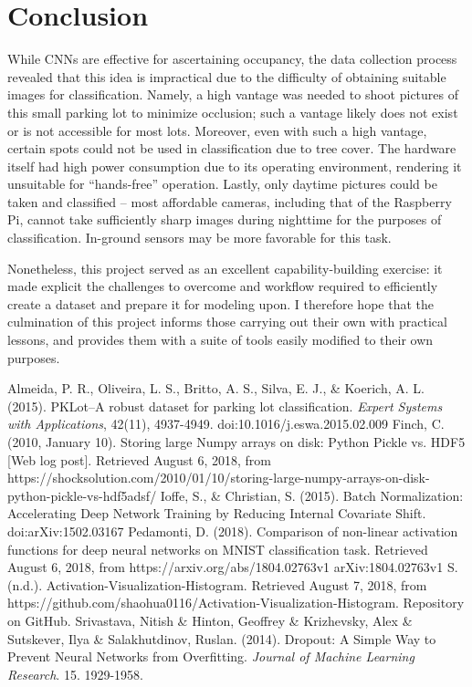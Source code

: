 \documentclass[a4paper, 11pt]{article} %
\begin{document}
\section{Conclusion}
	While CNNs are effective for ascertaining occupancy, the data collection 
	process 
	revealed that this idea is impractical due to the difficulty of 
	obtaining suitable images for classification. Namely, a high vantage was 
	needed to shoot pictures of this small parking lot to minimize occlusion; 
	such a vantage likely does not exist or is not accessible 
	for most lots. Moreover, even with such a high vantage, certain spots could 
	not be used in classification due to tree cover. The hardware itself 
	had high power consumption due to its operating environment, rendering it 
	unsuitable for ``hands-free'' operation. Lastly, only daytime pictures 
	could be taken and classified -- most affordable cameras, including that of 
	the Raspberry Pi, cannot take sufficiently sharp images during nighttime 
	for the purposes of classification. In-ground sensors may be more favorable 
	for this task.
	
	\hspace*{-6mm}Nonetheless, this project served as an excellent 
	capability-building exercise: it made explicit the challenges to overcome 
	and workflow 
	required to efficiently create a dataset and prepare it for modeling upon. 
	I therefore hope that the culmination of this project informs those 
	carrying out their own with practical lessons, and provides them with a 
	suite of tools easily modified to their own purposes.
\newpage
\begin{thebibliography}{unsrt}
		Almeida, P. R., Oliveira, L. S., Britto, A. S., Silva, E. J., \& Koerich, A. L. (2015). PKLot--A robust 
		dataset for parking lot classification. \textit{Expert Systems with Applications}, 42(11), 
		4937-4949. doi:10.1016/j.eswa.2015.02.009
		Finch, C. (2010, January 10). Storing large Numpy arrays on disk: 
		Python Pickle vs. HDF5 [Web log post]. Retrieved August 6, 2018, from 
		https://shocksolution.com/2010/01/10/storing-large-numpy-arrays-on-disk-python-pickle-vs-hdf5adsf/
		Ioffe, S., \& Christian, S. (2015). Batch Normalization: Accelerating 
		Deep Network Training by Reducing Internal Covariate Shift. 
		doi:arXiv:1502.03167
		Pedamonti, D. (2018). Comparison of non-linear activation functions for 
		deep neural networks on MNIST classification task. Retrieved August 6, 
		2018, from https://arxiv.org/abs/1804.02763v1 arXiv:1804.02763v1
		S. (n.d.). Activation-Visualization-Histogram. Retrieved August 7, 
		2018, from 
		https://github.com/shaohua0116/Activation-Visualization-Histogram.
		Repository on GitHub.
		Srivastava, Nitish \& Hinton, Geoffrey \& Krizhevsky, Alex \& 
		Sutskever, Ilya \& Salakhutdinov, Ruslan. (2014). Dropout: A Simple Way 
		to Prevent Neural Networks from Overfitting. \textit{Journal of Machine 
		Learning Research}. 15. 1929-1958.
\end{thebibliography}
\end{document}
